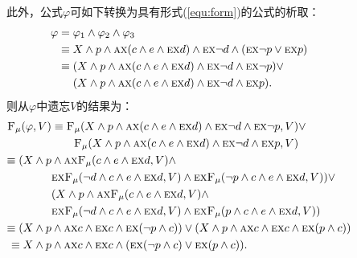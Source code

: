 \documentclass[9pt, CJK]{beamer}
\begin{document}
\begin{frame}
{\begin{example}
\begin{columns}
	此外，公式$\varphi$可如下转换为具有形式(\ref{equ:form})的公式的析取：
	\begin{align*}
		\varphi & = \varphi_1 \wedge \varphi_2 \wedge \varphi_3\\
		& \equiv X \wedge p \wedge \textsc{a}\textsc{x}(c \wedge e \wedge \textsc{e}\textsc{x} d) \wedge \textsc{e}\textsc{x} \neg d \wedge (\textsc{e}\textsc{x} \neg p \vee \textsc{e}\textsc{x} p)\\
		& \equiv (X \wedge p \wedge \textsc{a}\textsc{x}(c \wedge e \wedge \textsc{e}\textsc{x} d) \wedge \textsc{e}\textsc{x} \neg d \wedge \textsc{e}\textsc{x} \neg p) \vee\\
		& \quad\ (X \wedge p \wedge \textsc{a}\textsc{x}(c \wedge e \wedge \textsc{e}\textsc{x} d) \wedge \textsc{e}\textsc{x} \neg d \wedge \textsc{e}\textsc{x}  p).
	\end{align*}
		则从$\varphi$中遗忘$V$的结果为：
		\begin{align*}
			{\textsc{F}_{\textsc{$\mu$}}}(\varphi,V) & \equiv {\textsc{F}_{\textsc{$\mu$}}}(X \wedge p \wedge \textsc{a}\textsc{x}(c \wedge e \wedge \textsc{e}\textsc{x} d) \wedge \textsc{e}\textsc{x} \neg d \wedge \textsc{e}\textsc{x} \neg p, V) \vee \\
			& \qquad {\textsc{F}_{\textsc{$\mu$}}}(X \wedge p \wedge \textsc{a}\textsc{x}(c \wedge e \wedge \textsc{e}\textsc{x} d) \wedge \textsc{e}\textsc{x} \neg d \wedge \textsc{e}\textsc{x}  p,V) \\
			 \equiv (X \wedge p & \wedge \textsc{a}\textsc{x}{\textsc{F}_{\textsc{$\mu$}}}(c \wedge e \wedge \textsc{e}\textsc{x} d, V) \wedge\\
			&  \textsc{e}\textsc{x}{\textsc{F}_{\textsc{$\mu$}}}(\neg d \wedge c \wedge e \wedge \textsc{e}\textsc{x} d, V) \wedge  \textsc{e}\textsc{x}{\textsc{F}_{\textsc{$\mu$}}}(\neg p \wedge c \wedge e \wedge \textsc{e}\textsc{x} d, V) )\vee \\
			&  (X \wedge p \wedge \textsc{a}\textsc{x}{\textsc{F}_{\textsc{$\mu$}}}(c \wedge e \wedge \textsc{e}\textsc{x} d, V) \wedge\\
			&  \textsc{e}\textsc{x}{\textsc{F}_{\textsc{$\mu$}}}(\neg d \wedge c \wedge e \wedge \textsc{e}\textsc{x} d, V) \wedge  \textsc{e}\textsc{x}{\textsc{F}_{\textsc{$\mu$}}}( p \wedge c \wedge e \wedge \textsc{e}\textsc{x} d, V)) \\
		 \equiv 	(X \wedge p & \wedge \textsc{a}\textsc{x} c \wedge \textsc{e}\textsc{x} c \wedge \textsc{e}\textsc{x} (\neg p \wedge c)) \vee
			(X \wedge p \wedge \textsc{a}\textsc{x} c \wedge \textsc{e}\textsc{x} c \wedge \textsc{e}\textsc{x} (p \wedge c)) \\
			 \equiv  X \wedge p & \wedge \textsc{a}\textsc{x} c \wedge \textsc{e}\textsc{x} c \wedge (\textsc{e}\textsc{x} (\neg p \wedge c) \vee \textsc{e}\textsc{x} (p \wedge c)).
		\end{align*}
	\end{columns}
	\end{example}}
\end{frame}
\end{document}
